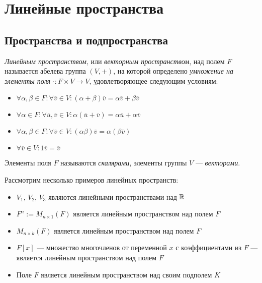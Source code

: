 \section{Линейные пространства}

\subsection{Пространства и подпространства}

\begin{definition}
	\textit{Линейным пространством}, или \textit{векторным пространством}, над полем $F$ называется абелева группа $(V, +)$, на которой определено \textit{умножение на элементы поля} $\cdot: F \times V \rightarrow V$, удовлетворяющее следующим условиям:
	\begin{itemize}
		\item $\forall \alpha, \beta \in F: \forall \overline{v} \in V: (\alpha + \beta)\overline{v} = \alpha\overline{v} + \beta\overline{v}$
		\item $\forall \alpha \in F: \forall \overline{u}, \overline{v} \in V: \alpha(\overline{u} + \overline{v}) = \alpha\overline{u} + \alpha\overline{v}$
		\item $\forall \alpha, \beta \in F: \forall \overline{v} \in V: (\alpha\beta)\overline{v} = \alpha(\beta\overline{v})$
		\item $\forall \overline{v} \in V: 1\overline{v} = \overline{v}$
	\end{itemize}

	Элементы поля $F$ называются \textit{скалярами}, элементы группы $V$ --- \textit{векторами}.
\end{definition}

\pagebreak 
\begin{example}
	Рассмотрим несколько примеров линейных пространств:
	\begin{itemize}
		\item $V_1$, $V_2$, $V_3$ являются линейными пространствами над $\mathbb{R}$
		\item $F^n := M_{n \times 1}(F)$ является линейным пространством над полем $F$
		\item $M_{n \times k}(F)$ является линейным пространством над полем $F$
		\item $F[x]$ --- множество многочленов от переменной $x$ с коэффициентами из $F$ --- является линейным пространством над полем $F$
		\item Поле $F$ является линейным пространством над своим подполем $K$
	\end{itemize}
\end{example}

